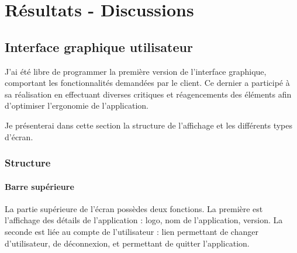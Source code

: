 \cleardoublepage

\chapter{Résultats - Discussions}


\section{Interface graphique utilisateur}

J'ai été libre de programmer la première version de l'interface graphique, comportant les fonctionnalités demandées par le client. Ce dernier a participé à sa réalisation en effectuant diverses critiques et réagencements des éléments afin d'optimiser l'ergonomie de l'application.

Je présenterai dans cette section la structure de l'affichage et les différents types d'écran.


\subsection{Structure}


\subsubsection{Barre supérieure}

La partie supérieure de l'écran possèdes deux fonctions. La première est l'affichage des détails de l'application : logo, nom de l'application, version. La seconde est liée au compte de l'utilisateur : lien permettant de changer d'utilisateur, de déconnexion, et permettant de quitter l'application.

